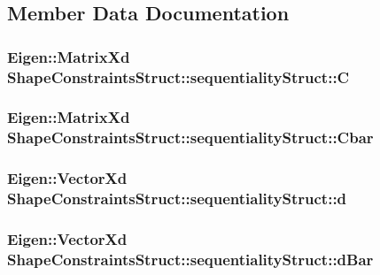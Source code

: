 \subsection{\-Member \-Data \-Documentation}
\hypertarget{structShapeConstraintsStruct_1_1sequentialityStruct_acbb064e5a1baab8b79ffd6c367f31054}{
\subsubsection[{\-C}]{\setlength{\rightskip}{0pt plus 5cm}\-Eigen\-::\-Matrix\-Xd {\bf \-Shape\-Constraints\-Struct\-::sequentiality\-Struct\-::\-C}}}\label{structShapeConstraintsStruct_1_1sequentialityStruct_acbb064e5a1baab8b79ffd6c367f31054}
\hypertarget{structShapeConstraintsStruct_1_1sequentialityStruct_a9b9ba6ba7272ef35f2588d852ed967f3}{
\subsubsection[{\-Cbar}]{\setlength{\rightskip}{0pt plus 5cm}\-Eigen\-::\-Matrix\-Xd {\bf \-Shape\-Constraints\-Struct\-::sequentiality\-Struct\-::\-Cbar}}}\label{structShapeConstraintsStruct_1_1sequentialityStruct_a9b9ba6ba7272ef35f2588d852ed967f3}
\hypertarget{structShapeConstraintsStruct_1_1sequentialityStruct_a029a0d4aa9db75b508f9149a262ed28d}{
\subsubsection[{d}]{\setlength{\rightskip}{0pt plus 5cm}\-Eigen\-::\-Vector\-Xd {\bf \-Shape\-Constraints\-Struct\-::sequentiality\-Struct\-::d}}}\label{structShapeConstraintsStruct_1_1sequentialityStruct_a029a0d4aa9db75b508f9149a262ed28d}
\hypertarget{structShapeConstraintsStruct_1_1sequentialityStruct_a68d3aa9f05279aa1ba92e60205a68677}{
\subsubsection[{d\-Bar}]{\setlength{\rightskip}{0pt plus 5cm}\-Eigen\-::\-Vector\-Xd {\bf \-Shape\-Constraints\-Struct\-::sequentiality\-Struct\-::d\-Bar}}}\label{structShapeConstraintsStruct_1_1sequentialityStruct_a68d3aa9f05279aa1ba92e60205a68677}
